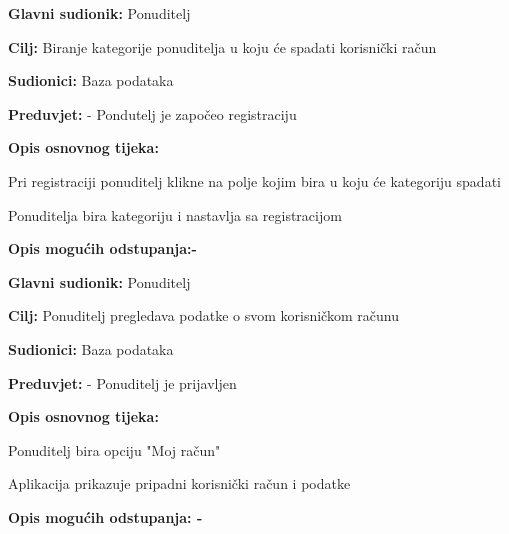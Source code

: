                     \noindent {}
					\begin{packed_item}
	
						\item \textbf{Glavni sudionik: } Ponuditelj
						\item  \textbf{Cilj:} Biranje kategorije ponuditelja u koju će spadati korisnički račun
						\item  \textbf{Sudionici:} Baza podataka
						\item  \textbf{Preduvjet:} - Pondutelj je započeo registraciju
						\item  \textbf{Opis osnovnog tijeka:}
						
						\item[] \begin{packed_enum}
	
							\item Pri registraciji ponuditelj klikne na polje kojim bira u koju će kategoriju spadati
							\item Ponuditelja bira kategoriju i nastavlja sa registracijom
						\end{packed_enum}
						
						\item  \textbf{Opis mogućih odstupanja:-}
					
					\end{packed_item}

                    \noindent {}
					\begin{packed_item}
	
						\item \textbf{Glavni sudionik: } Ponuditelj
						\item  \textbf{Cilj:} Ponuditelj pregledava podatke o svom korisničkom računu
						\item  \textbf{Sudionici:} Baza podataka
						\item  \textbf{Preduvjet:} - Ponuditelj je prijavljen
						\item  \textbf{Opis osnovnog tijeka:}
						
						\item[] \begin{packed_enum}
	
							\item Ponuditelj bira opciju "Moj račun"
							\item Aplikacija prikazuje pripadni korisnički račun i podatke
						\end{packed_enum}
						
						\item  \textbf{Opis mogućih odstupanja: -}
						
					\end{packed_item}

